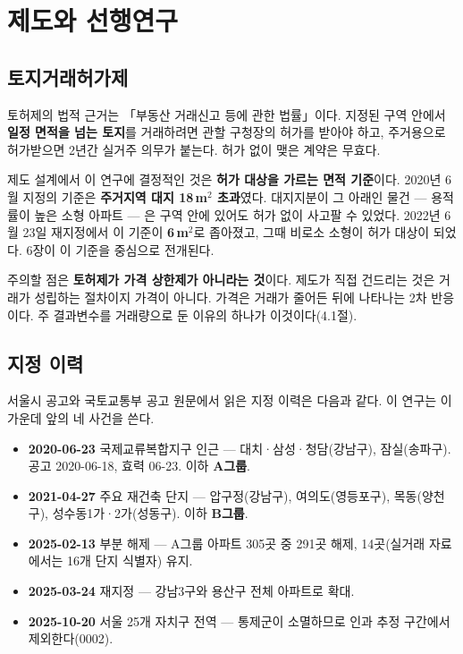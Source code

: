 
\section{제도와 선행연구}

\subsection{토지거래허가제}

토허제의 법적 근거는 「부동산 거래신고 등에 관한 법률」이다. 지정된 구역 안에서
\textbf{일정 면적을 넘는 토지}를 거래하려면 관할 구청장의 허가를 받아야 하고,
주거용으로 허가받으면 2년간 실거주 의무가 붙는다. 허가 없이 맺은 계약은 무효다.

제도 설계에서 이 연구에 결정적인 것은 \textbf{허가 대상을 가르는 면적 기준}이다.
2020년 6월 지정의 기준은 \textbf{주거지역 대지 18\,m$^2$ 초과}였다. 대지지분이 그
아래인 물건 --- 용적률이 높은 소형 아파트 --- 은 구역 안에 있어도 허가 없이 사고팔
수 있었다. 2022년 6월 23일 재지정에서 이 기준이 \textbf{6\,m$^2$}로 좁아졌고,
그때 비로소 소형이 허가 대상이 되었다. 6장이 이 기준을 중심으로 전개된다.

주의할 점은 \textbf{토허제가 가격 상한제가 아니라는 것}이다. 제도가 직접 건드리는
것은 거래가 성립하는 절차이지 가격이 아니다. 가격은 거래가 줄어든 뒤에 나타나는
2차 반응이다. 주 결과변수를 거래량으로 둔 이유의 하나가 이것이다(4.1절).

\subsection{지정 이력}

서울시 공고와 국토교통부 공고 원문에서 읽은 지정 이력은 다음과 같다. 이 연구는
이 가운데 앞의 네 사건을 쓴다.

\begin{itemize}[leftmargin=2em, itemsep=2pt]
  \item \textbf{2020-06-23} 국제교류복합지구 인근 --- 대치·삼성·청담(강남구),
        잠실(송파구). 공고 2020-06-18, 효력 06-23. 이하 \textbf{A그룹}.
  \item \textbf{2021-04-27} 주요 재건축 단지 --- 압구정(강남구), 여의도(영등포구),
        목동(양천구), 성수동1가·2가(성동구). 이하 \textbf{B그룹}.
  \item \textbf{2025-02-13} 부분 해제 --- A그룹 아파트 305곳 중 291곳 해제,
        14곳(실거래 자료에서는 16개 단지 식별자) 유지.
  \item \textbf{2025-03-24} 재지정 --- 강남3구와 용산구 전체 아파트로 확대.
  \item \textbf{2025-10-20} 서울 25개 자치구 전역 --- 통제군이 소멸하므로 인과
        추정 구간에서 제외한다(0002).
\end{itemize}

